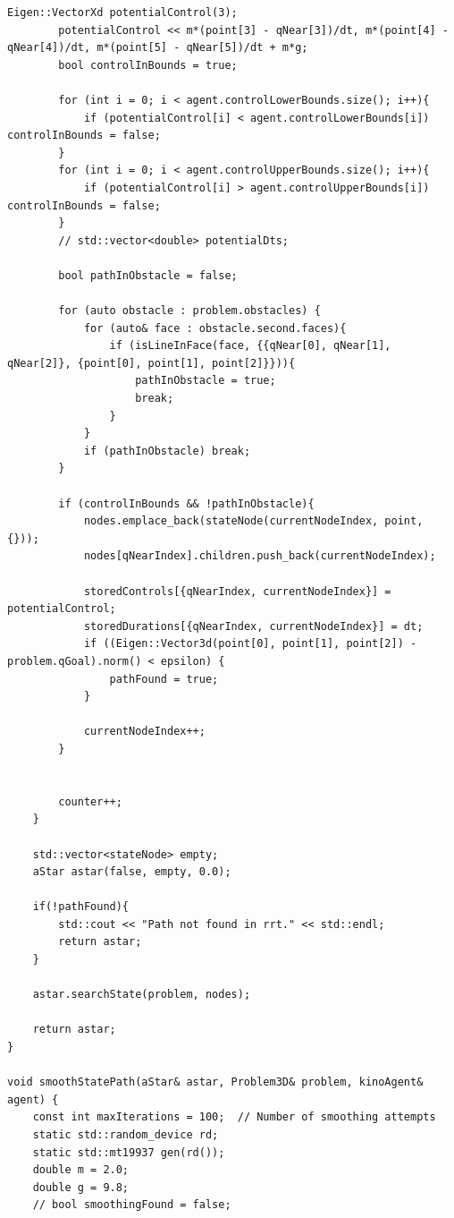 \documentclass{article}
\begin{document}
\begin{lstlisting}[style=cppstyle]
        Eigen::VectorXd potentialControl(3);
        potentialControl << m*(point[3] - qNear[3])/dt, m*(point[4] - qNear[4])/dt, m*(point[5] - qNear[5])/dt + m*g;
        bool controlInBounds = true;

        for (int i = 0; i < agent.controlLowerBounds.size(); i++){
            if (potentialControl[i] < agent.controlLowerBounds[i]) controlInBounds = false;
        }
        for (int i = 0; i < agent.controlUpperBounds.size(); i++){
            if (potentialControl[i] > agent.controlUpperBounds[i]) controlInBounds = false;
        }
        // std::vector<double> potentialDts;

        bool pathInObstacle = false;

        for (auto obstacle : problem.obstacles) {
            for (auto& face : obstacle.second.faces){
                if (isLineInFace(face, {{qNear[0], qNear[1], qNear[2]}, {point[0], point[1], point[2]}})){
                    pathInObstacle = true;
                    break;
                } 
            }
            if (pathInObstacle) break;
        }

        if (controlInBounds && !pathInObstacle){
            nodes.emplace_back(stateNode(currentNodeIndex, point, {}));
            nodes[qNearIndex].children.push_back(currentNodeIndex);

            storedControls[{qNearIndex, currentNodeIndex}] = potentialControl;
            storedDurations[{qNearIndex, currentNodeIndex}] = dt;
            if ((Eigen::Vector3d(point[0], point[1], point[2]) - problem.qGoal).norm() < epsilon) {
                pathFound = true;
            }

            currentNodeIndex++;
        }
            

        counter++;
    }

    std::vector<stateNode> empty;
    aStar astar(false, empty, 0.0);

    if(!pathFound){
        std::cout << "Path not found in rrt." << std::endl;
        return astar;
    }

    astar.searchState(problem, nodes);
    
    return astar;
}

void smoothStatePath(aStar& astar, Problem3D& problem, kinoAgent& agent) {
    const int maxIterations = 100;  // Number of smoothing attempts
    static std::random_device rd;
    static std::mt19937 gen(rd());
    double m = 2.0;
    double g = 9.8;
    // bool smoothingFound = false;



\end{lstlisting}
\end{document}
